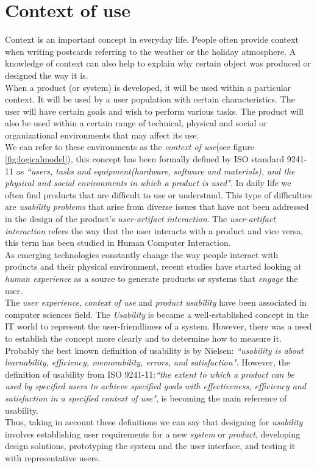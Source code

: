 \section{Context of use}\label{contextofuse}

Context is an important concept in everyday life. People often provide
context when writing postcards referring to the weather or the holiday
atmosphere. A knowledge of context can also help to explain why certain
object was produced or designed the way it is.\\ When a product (or system) is developed, it
will be used within a particular context. It will be used by a user
population with certain characteristics. The user will have certain
goals and wish to perform various tasks. The product will also be used
within a certain range of technical, physical and social or
organizational environments\cite{maguire2001context} that may affect
its use.\\   
We can refer to these environments as the \textit{context of use}(see
figure \ref{fig:logicalmodel}), this concept has been formally defined
by ISO standard 9241-11\cite{international1998iso} as \textit{``users,
tasks and equipment(hardware, software and materials), and the
physical and social environments in which a product is used"}. 
In daily life we often find products that are difficult to use or
understand. This type of difficulties are \textit{usability problems}
that arise from  diverse issues that have not been addressed in the
design of the product's \textit{user-artifact interaction}. The
\textit{user-artifact interaction} refers the way that the user
interacts with a product and vice versa, this term has been studied
in Human Computer Interaction. \\As emerging technologies constantly
change the way people interact with products and their physical
environment, recent studies have started looking at \textit{human
experience} as a source to generate products or systems that
\textit{engage} the user.\\
The \textit{user experience}, \textit{context of use} and
\textit{product usability} have been associated in computer sciences
field. The \textit{Usability} is became a well-established concept in
the IT world to represent the user-friendliness of a system. However,
there was a need to establish the concept more clearly and to
determine how to measure it. Probably the best known definition of
usability is by Nielsen\cite{nielsen1994usability}: 
\textit{``usability is about learnability, efficiency, 
memorability, errors, and satisfaction".}
However, the definition of usability from ISO
9241-11\cite{international1998iso}:\textit{``the extent to which a
product can be used by specified users to achieve specified  goals
with effectiveness, efficiency and satisfaction in a  specified
context of use"}, is becoming the main reference of usability. \\
Thus, taking in account these definitions we can say that designing for 
\textit{usability} involves establishing user requirements for a new
\textit{system} or \textit{product}, developing design solutions,
prototyping the system and the user interface, and testing it with
representative users.\\

